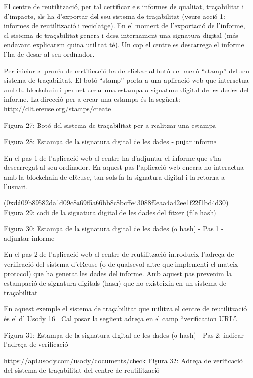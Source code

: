 \documentclass[
]{book}
\begin{document}
El centre de reutilització, per tal certificar els informes de qualitat, traçabilitat i d'impacte, els ha d'exportar del seu sistema de traçabilitat (veure acció 1: informes de reutilització i reciclatge). En el moment de l'exportació de l'informe, el sistema de traçabilitat genera i desa internament una signatura digital (més endavant explicarem quina utilitat té). Un cop el centre es descarrega el informe l'ha de desar al seu ordinador.

Per iniciar el procés de certificació ha de clickar al botó del menú ``stamp'' del seu sistema de traçabilitat. El botó ``stamp'' porta a una aplicació web que interactua amb la blockchain i permet crear una estampa o signatura digital de les dades del informe. La direcció per a crear una estampa és la següent: \url{http://dlt.ereuse.org/stamps/create}

Figura 27: Botó del sistema de traçabilitat per a realitzar una estampa

Figura 28: Estampa de la signatura digital de les dades - pujar informe

En el pas 1 de l'aplicació web el centre ha d'adjuntar el informe que s'ha descarregat al seu ordinador. En aquest pas l'aplicació web encara no interactua amb la blockchain de eReuse, tan sols fa la signatura digital i la retorna a l'usuari.

(0xdd09b89582da1d09c8a69f5a66bb8c8bcffe43088f9eaa4a42ee1f22f1bd4d30) Figura 29: codi de la signatura digital de les dades del fitxer (file hash)

Figura 30: Estampa de la signatura digital de les dades (o hash) - Pas 1 - adjuntar informe

En el pas 2 de l'aplicació web el centre de reutilització introdueix l'adreça de verificació del sistema d'eReuse (o de qualsevol altre que implementi el mateix protocol) que ha generat les dades del informe. Amb aquest pas prevenim la estampació de signatura digitals (hash) que no existeixin en un sistema de traçabilitat

En aquest exemple el sistema de traçabilitat que utilitza el centre de reutilització és el d' Usody 16 . Cal posar la següent adreça en el camp ``verification URL''.

Figura 31: Estampa de la signatura digital de les dades (o hash) - Pas 2: indicar l'adreça de verificació

\url{https://api.usody.com/usody/documents/check} Figura 32: Adreça de verificació del sistema de traçabilitat del centre de reutilització
\end{document}
